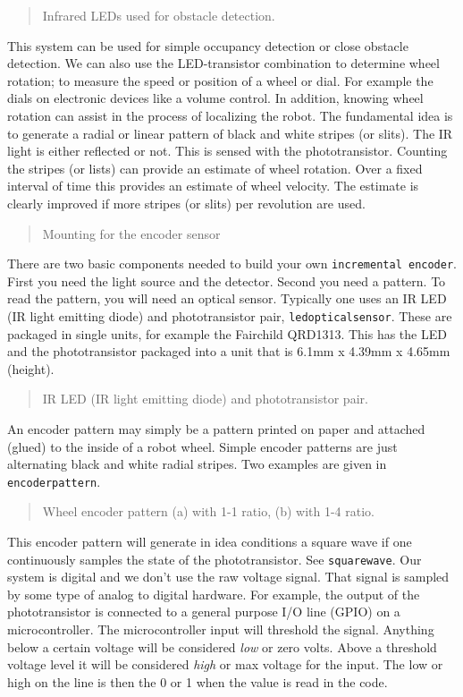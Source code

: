 \begin{quote}
Infrared LEDs used for obstacle detection.
\end{quote}

This system can be used for simple occupancy detection or close obstacle
detection. We can also use the LED-transistor combination to determine
wheel rotation; to measure the speed or position of a wheel or dial. For
example the dials on electronic devices like a volume control. In
addition, knowing wheel rotation can assist in the process of localizing
the robot. The fundamental idea is to generate a radial or linear
pattern of black and white stripes (or slits). The IR light is either
reflected or not. This is sensed with the phototransistor. Counting the
stripes (or lists) can provide an estimate of wheel rotation. Over a
fixed interval of time this provides an estimate of wheel velocity. The
estimate is clearly improved if more stripes (or slits) per revolution
are used.

\begin{quote}
Mounting for the encoder sensor
\end{quote}

There are two basic components needed to build your own
\texttt{incremental\ encoder}. First you need the light source and the
detector. Second you need a pattern. To read the pattern, you will need
an optical sensor. Typically one uses an IR LED (IR light emitting
diode) and phototransistor pair, \texttt{ledopticalsensor}. These are
packaged in single units, for example the Fairchild QRD1313. This has
the LED and the phototransistor packaged into a unit that is 6.1mm x
4.39mm x 4.65mm (height).

\begin{quote}
IR LED (IR light emitting diode) and phototransistor pair.
\end{quote}

An encoder pattern may simply be a pattern printed on paper and attached
(glued) to the inside of a robot wheel. Simple encoder patterns are just
alternating black and white radial stripes. Two examples are given in
\texttt{encoderpattern}.

\begin{quote}
Wheel encoder pattern (a) with 1-1 ratio, (b) with 1-4 ratio.
\end{quote}

This encoder pattern will generate in idea conditions a square wave if
one continuously samples the state of the phototransistor. See
\texttt{squarewave}. Our system is digital and we don't use the raw
voltage signal. That signal is sampled by some type of analog to digital
hardware. For example, the output of the phototransistor is connected to
a general purpose I/O line (GPIO) on a microcontroller. The
microcontroller input will threshold the signal. Anything below a
certain voltage will be considered \emph{low} or zero volts. Above a
threshold voltage level it will be considered \emph{high} or max voltage
for the input. The low or high on the line is then the 0 or 1 when the
value is read in the code.

